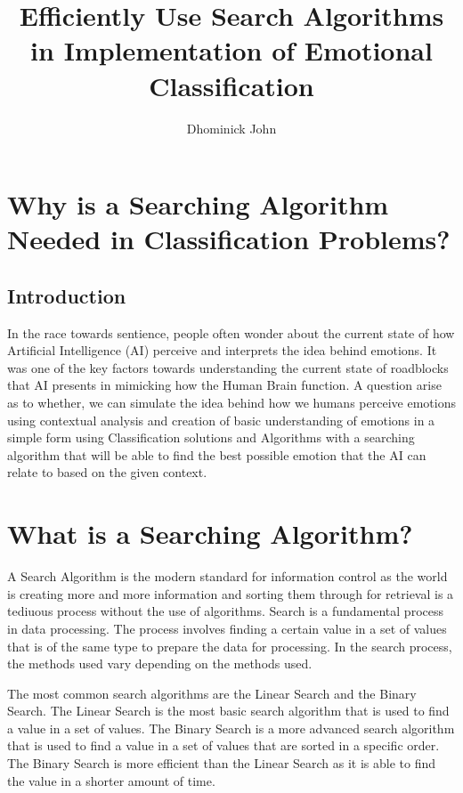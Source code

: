 \documentclass[12pt]{article}
\title{Efficiently Use Search Algorithms in Implementation of Emotional Classification}
\author{Dhominick John}
\begin{document}
    \maketitle
    \section*{Why is a Searching Algorithm Needed in Classification Problems?}
    \subsection*{Introduction}
    \par In the race towards sentience, people often wonder about the current state of how Artificial Intelligence (AI) perceive and interprets the idea behind emotions. It was one of the key factors towards understanding the current state of roadblocks that AI presents in mimicking how the Human Brain function. A question arise as to whether, we can simulate the idea behind how we humans perceive emotions using contextual analysis and creation of basic understanding of emotions in a simple form using Classification solutions and Algorithms with a searching algorithm that will be able to find the best possible emotion that the AI can relate to based on the given context.\cite{sentiment_analysis}
    \section*{What is a Searching Algorithm?}
    \par A Search Algorithm is the modern standard for information control as the world is creating more and more information and sorting them through for retrieval is a tediuous process without the use of algorithms. Search is a fundamental process in data processing. The process involves finding a certain value in a set of values that is of the same type to prepare the data for processing. In the search process, the methods used vary depending on the methods used. \cite{sorting_algorithm}
    \par The most common search algorithms are the Linear Search and the Binary Search. The Linear Search is the most basic search algorithm that is used to find a value in a set of values. The Binary Search is a more advanced search algorithm that is used to find a value in a set of values that are sorted in a specific order. The Binary Search is more efficient than the Linear Search as it is able to find the value in a shorter amount of time.\cite*{sorting_algorithm_comparison}
\end{document}
